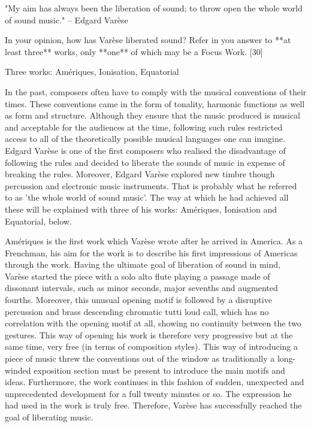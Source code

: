 \documentclass[a4paper]{article}
\begin{document}
"My aim has always been the liberation of sound; to throw open the whole world
of sound music." -- Edgard Varèse

In your opinion, how has Varèse liberated sound? Refer in you answer to
**at least three** works, only **one** of which may be a Focus Work. [30]

Three works: Amériques, Ionisation, Equatorial

In the past, composers often have to comply with the musical conventions of
their times. These conventions came in the form of tonality, harmonic functions
as well as form and structure. Although they ensure that the music produced is
musical and acceptable for the audiences at the time, following such rules
restricted access to all of the theoretically possible musical languages one
can imagine. Edgard Varèse is one of the first composers who realised the
disadvantage of following the rules and decided to liberate the sounds of music
in expense of breaking the rules. Moreover, Edgard Varèse explored new timbre
though percussion and electronic music instruments. That is probably what
he referred to as 'the whole world of sound music'. The way at which he had
achieved all these will be explained with three of his works: Amériques,
Ionisation and Equatorial, below.

Amériques is the first work which Varèse wrote after he arrived in America. As
a Frenchman, his aim for the work is to describe his first impressions of
Americas through the work. Having the ultimate goal of liberation of sound in
mind, Varèse started the piece with a solo alto flute playing a passage made of
dissonant intervals, such as minor seconds, major sevenths and augmented
fourths. Moreover, this unusual opening motif is followed by a disruptive
percussion and brass descending chromatic tutti loud call, which has no
correlation with the opening motif at all, showing no continuity between the
two gestures. This way of opening his work is therefore very progressive but at
the same time, very free (in terms of composition styles). This way of
introducing a piece of music threw the conventions out of the window as
traditionally a long-winded exposition section must be present to introduce the
main motifs and ideas. Furthermore, the work continues in this fashion of
sudden, unexpected and unprecedented development for a full twenty minutes or
so. The expression he had used in the work is truly free. Therefore, Varèse has
successfully reached the goal of liberating music.
\end{document}
